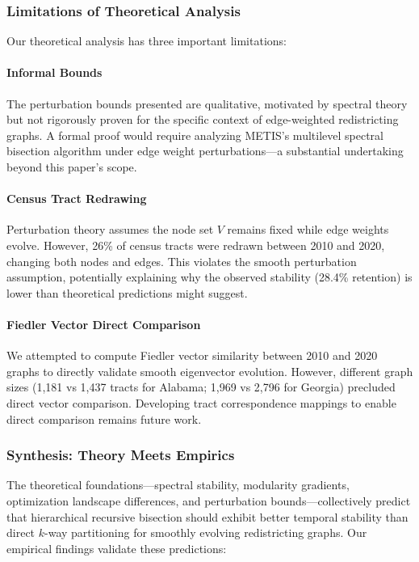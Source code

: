 \subsubsection{Limitations of Theoretical Analysis}

Our theoretical analysis has three important limitations:

\paragraph{Informal Bounds} The perturbation bounds presented are qualitative, motivated by spectral theory but not rigorously proven for the specific context of edge-weighted redistricting graphs. A formal proof would require analyzing METIS's multilevel spectral bisection algorithm under edge weight perturbations---a substantial undertaking beyond this paper's scope.

\paragraph{Census Tract Redrawing} Perturbation theory assumes the node set $V$ remains fixed while edge weights evolve. However, 26\% of census tracts were redrawn between 2010 and 2020, changing both nodes and edges. This violates the smooth perturbation assumption, potentially explaining why the observed stability (28.4\% retention) is lower than theoretical predictions might suggest.

\paragraph{Fiedler Vector Direct Comparison} We attempted to compute Fiedler vector similarity between 2010 and 2020 graphs to directly validate smooth eigenvector evolution. However, different graph sizes (1,181 vs 1,437 tracts for Alabama; 1,969 vs 2,796 for Georgia) precluded direct vector comparison. Developing tract correspondence mappings to enable direct comparison remains future work.

\subsubsection{Synthesis: Theory Meets Empirics}

The theoretical foundations---spectral stability, modularity gradients, optimization landscape differences, and perturbation bounds---collectively predict that hierarchical recursive bisection should exhibit better temporal stability than direct $k$-way partitioning for smoothly evolving redistricting graphs. Our empirical findings validate these predictions:

